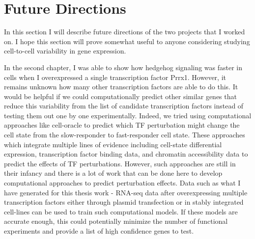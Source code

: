 \section{Future Directions}

In this section I will describe future directions of the two projects that I worked on. I hope this section will prove somewhat useful to anyone considering studying cell-to-cell variability in gene expression. 

In the second chapter, I was able to show how hedgehog signaling was faster in cells when I overexpressed a single transcription factor Prrx1. However, it remains unknown how many other transcription factors are able to do this. It would be helpful if we could computationally predict other similar genes that reduce this variability from the list of candidate transcription factors instead of testing them out one by one experimentally. Indeed, we tried using computational approaches like cell-oracle \cite{kamimoto2020} to predict which TF perturbation might change the cell state from the slow-responder to fast-responder cell state. These approaches which integrate multiple lines of evidence including cell-state differential expression, transcription factor binding data, and chromatin accessibility data to predict the effects of TF perturbations. However, such approaches are still in their infancy and there is a lot of work that can be done here to develop computational approaches to predict perturbation effects. Data such as what I have generated for this thesis work - RNA-seq data after overexpressing multiple transcription factors either through plasmid transfection or in stably integrated cell-lines can be used to train such computational models. If these models are accurate enough, this could potentially minimize the number of functional experiments and provide a list of high confidence genes to test.

